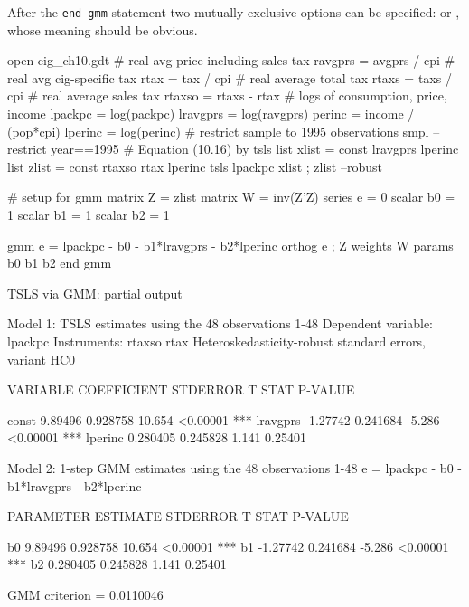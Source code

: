 After the \texttt{end gmm} statement two mutually
exclusive options can be specified:  or
, whose meaning should be obvious.

\begin{script}[htbp]
  \label{gmm-tsls-ex}
\begin{scode}
open cig_ch10.gdt
# real avg price including sales tax
ravgprs = avgprs / cpi
# real avg cig-specific tax
rtax = tax / cpi
# real average total tax
rtaxs = taxs / cpi
# real average sales tax
rtaxso = rtaxs - rtax
# logs of consumption, price, income
lpackpc = log(packpc)
lravgprs = log(ravgprs)
perinc = income / (pop*cpi)
lperinc = log(perinc)
# restrict sample to 1995 observations
smpl --restrict year==1995
# Equation (10.16) by tsls
list xlist = const lravgprs lperinc
list zlist = const rtaxso rtax lperinc
tsls lpackpc xlist ; zlist --robust

# setup for gmm
matrix Z = { zlist }
matrix W = inv(Z'Z)
series e = 0
scalar b0 = 1
scalar b1 = 1
scalar b2 = 1

gmm e = lpackpc - b0 - b1*lravgprs - b2*lperinc
  orthog e ; Z
  weights W
  params b0 b1 b2
end gmm 
\end{scode}
\end{script}

\begin{script}[htbp]
  \caption{TSLS via GMM: partial output}
  \label{gmm-tsls-out}
\begin{code}
Model 1: TSLS estimates using the 48 observations 1-48
Dependent variable: lpackpc
Instruments: rtaxso rtax 
Heteroskedasticity-robust standard errors, variant HC0

      VARIABLE       COEFFICIENT        STDERROR      T STAT   P-VALUE

  const                 9.89496          0.928758     10.654  <0.00001 ***
  lravgprs             -1.27742          0.241684     -5.286  <0.00001 ***
  lperinc               0.280405         0.245828      1.141   0.25401

Model 2: 1-step GMM estimates using the 48 observations 1-48
e = lpackpc - b0 - b1*lravgprs - b2*lperinc

      PARAMETER       ESTIMATE          STDERROR      T STAT   P-VALUE

  b0                    9.89496          0.928758     10.654  <0.00001 ***
  b1                   -1.27742          0.241684     -5.286  <0.00001 ***
  b2                    0.280405         0.245828      1.141   0.25401

  GMM criterion = 0.0110046
\end{code}
\end{script}


